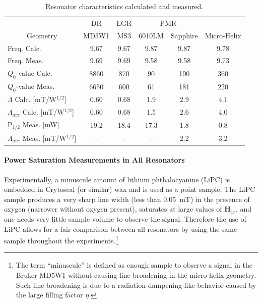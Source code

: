 \begin{table}[htb]
\centering
\caption[Resonator characteristics calculated and measured.]{Resonator characteristics calculated and measured.}
\label{table:chars}
\begin{tabular}{l|c|c|c|c|c}
\multicolumn{1}{l}{} & DR & LGR & \multicolumn{2}{c|}{PMR} &  \\
\multicolumn{1}{c||}{Geometry} & MD5W1 & MS3 & 6010LM & Sapphire & Micro-Helix \\ \hline \hline
\multicolumn{1}{l||}{Freq. Calc.} & \multicolumn{1}{c|}{9.67} & \multicolumn{1}{c|}{9.67} & \multicolumn{1}{c|}{9.87} & \multicolumn{1}{c|}{9.87} & 9.78 \\ \hline 
\multicolumn{1}{l||}{Freq. Meas.} & \multicolumn{1}{c|}{9.69} & \multicolumn{1}{c|}{9.69} & \multicolumn{1}{c|}{9.58} & \multicolumn{1}{c|}{9.58} & 9.73 \\ \hline 
\multicolumn{1}{l||}{$Q_0$-value Calc.} & \multicolumn{1}{c|}{8860} & \multicolumn{1}{c|}{870} & \multicolumn{1}{c|}{90} & \multicolumn{1}{c|}{190} & 360 \\ \hline 
\multicolumn{1}{l||}{$Q_0$-value Meas.} & \multicolumn{1}{c|}{6650} & \multicolumn{1}{c|}{600} & \multicolumn{1}{c|}{61} & \multicolumn{1}{c|}{181} & 220 \\ \hline
\multicolumn{1}{l||}{$\Lambda$ Calc. {[}mT/W$^{1/2}${]}} & \multicolumn{1}{c|}{0.60} & \multicolumn{1}{c|}{0.68} & \multicolumn{1}{c|}{1.9} & \multicolumn{1}{c|}{2.9} & 4.1 \\ \hline 
\multicolumn{1}{l||}{$\Lambda_{ave}$ Calc. {[}mT/W$^{1/2}${]}} & \multicolumn{1}{c|}{0.60} & \multicolumn{1}{c|}{0.68} & \multicolumn{1}{c|}{1.5} & \multicolumn{1}{c|}{2.6} & 4.0 \\ \hline 
\multicolumn{1}{l||}{P$_{1/2}$ Meas. {[}mW{]}} & \multicolumn{1}{c|}{19.2} & \multicolumn{1}{c|}{18.4} & \multicolumn{1}{c|}{17.3} & \multicolumn{1}{c|}{1.8} & 0.8 \\ \hline 
\multicolumn{1}{l||}{$\Lambda_{ave}$ Meas. {[}mT/W$^{1/2}${]}} & \multicolumn{1}{c|}{–} & \multicolumn{1}{c|}{–} & \multicolumn{1}{c|}{–} & \multicolumn{1}{c|}{2.2} & 3.2
\end{tabular}
\end{table}

\paragraph{Power Saturation Measurements in All Resonators}
Experimentally, a minuscule amount of lithium phthalocyanine (LiPC)\cite{Liu5438} is embedded in Crytoseal (or similar) wax and is used as a point sample. The LiPC sample produces a very sharp line width (less than 0.05~mT) in the presence of oxygen (narrower without oxygen present), saturates at large values of ${\mathbf H}_{1r}$, and one needs very little sample volume to observe the signal. Therefore the use of LiPC allows for a fair comparison between all resonators by using the same sample throughout the experiments.\footnote{The term ``minuscule'' is defined as enough sample to observe a signal in the Bruker MD5W1 without causing line broadening in the micro-helix geometry. Such line broadening is due to a radiation dampening-like behavior caused by the large filling factor $\eta$.}

